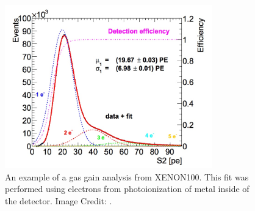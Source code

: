  \begin{figure}[t]
	\centering
	\includegraphics[width=0.8\textwidth]{tpc_gas_gain}
	\caption{An example of a gas gain analysis from XENON100.  This fit was performed using electrons from photoionization of metal inside of the detector.  Image Credit: .}
	\label{fig:tpc_gas_gain}
\end{figure}


